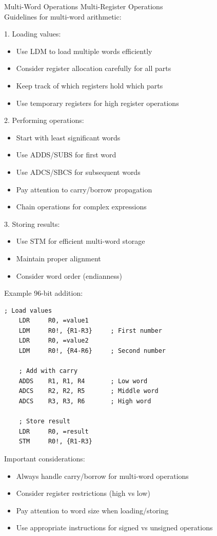 \begin{concept}{Multi-Word Operations} Multi-Register Operations\\
Guidelines for multi-word arithmetic:

1. Loading values:
\begin{itemize}
  \item Use LDM to load multiple words efficiently
  \item Consider register allocation carefully for all parts
  \item Keep track of which registers hold which parts
  \item Use temporary registers for high register operations
\end{itemize}

2. Performing operations:
\begin{itemize}
  \item Start with least significant words
  \item Use ADDS/SUBS for first word
  \item Use ADCS/SBCS for subsequent words
  \item Pay attention to carry/borrow propagation
  \item Chain operations for complex expressions
\end{itemize}

3. Storing results:
\begin{itemize}
  \item Use STM for efficient multi-word storage
  \item Maintain proper alignment
  \item Consider word order (endianness)
\end{itemize}

Example 96-bit addition:
\begin{lstlisting}[language=armasm, style=basesmol]
    ; Load values
    LDR     R0, =value1
    LDM     R0!, {R1-R3}     ; First number
    LDR     R0, =value2
    LDM     R0!, {R4-R6}     ; Second number
    
    ; Add with carry
    ADDS    R1, R1, R4       ; Low word
    ADCS    R2, R2, R5       ; Middle word
    ADCS    R3, R3, R6       ; High word
    
    ; Store result
    LDR     R0, =result
    STM     R0!, {R1-R3}
\end{lstlisting}
\end{concept}

\begin{remark}
Important considerations:
\begin{itemize}
  \item Always handle carry/borrow for multi-word operations
  \item Consider register restrictions (high vs low)
  \item Pay attention to word size when loading/storing
  \item Use appropriate instructions for signed vs unsigned operations
\end{itemize}
\end{remark}

